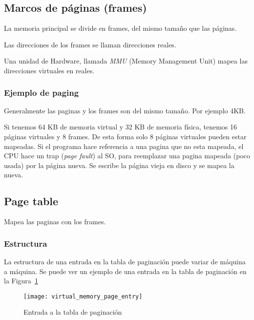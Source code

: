 \documentclass[a4paper, twoside]{article}
\begin{document}
\subsection{Marcos de páginas (frames)}

La memoria principal se divide en frames, del mismo tamaño que las páginas.

Las direcciones de los frames se llaman direcciones reales.

Una unidad de Hardware, llamada \emph{MMU} (Memory Management Unit) mapea las
direcciones virtuales en reales.

\subsubsection{Ejemplo de paging}

Generalmente las paginas y los frames son del mismo tamaño. Por ejemplo 4KB.

Si tenemos 64 KB de memoria virtual y 32 KB de memoria física, tenemos 16
páginas virtuales y 8 frames.
De esta forma solo 8 páginas virtuales pueden estar mapeadas.
Si el programa hace referencia a una pagina que no esta mapeada, el CPU hace
un trap (\emph{page fault}) al SO, para reemplazar una pagina mapeada
(poco usada) por la página nueva.
Se escribe la página vieja en disco y se mapea la nueva.

\subsection{Page table}

Mapea las paginas con los frames.

\subsubsection{Estructura}

La estructura de una entrada en la tabla de paginación puede variar de máquina
a máquina.
Se puede ver un ejemplo de una entrada en la tabla de paginación en la
Figura~\ref{fig:virtual_memory_page_entry}

\begin{figure}[h]
  \centering
  \texttt{[image: virtual\_memory\_page\_entry]}
  \caption{Entrada a la tabla de paginación}
  \label{fig:virtual_memory_page_entry}
\end{figure}
\end{document}
